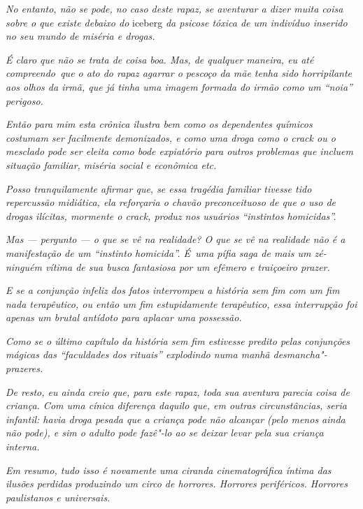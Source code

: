 \emph{No entanto, não se pode, no caso deste rapaz, se aventurar a dizer
muita coisa sobre o que existe debaixo do} iceberg \emph{da psicose tóxica de
um indivíduo inserido no seu mundo de miséria e drogas.}

\emph{É claro que não se trata de coisa boa. Mas, de qualquer maneira,
eu até compreendo~que o ato do rapaz agarrar o pescoço da mãe tenha sido
horripilante aos olhos da irmã, que já tinha uma imagem formada do irmão
como um ``noia'' perigoso.}

\emph{Então para mim esta crônica ilustra bem como os dependentes
químicos costumam ser facilmente demonizados, e como uma droga como o
crack ou o mesclado pode ser eleita como bode expiatório para outros
problemas que incluem situação familiar, miséria social e econômica
etc.}

\emph{Posso tranquilamente afirmar que, se essa tragédia familiar
tivesse tido repercussão midiática, ela reforçaria o chavão
preconceituoso de que o uso de drogas ilícitas, mormente o crack, produz
nos usuários ``instintos homicidas''.}

\emph{Mas --- pergunto --- o que se vê na realidade? O que se vê na
realidade não é a manifestação de um ``instinto homicida''. É~uma pífia
saga de mais um zé-ninguém vítima de sua busca fantasiosa por um efêmero
e traiçoeiro prazer.}

\emph{E se a conjunção infeliz dos fatos interrompeu a história sem fim
com um fim nada terapêutico, ou então um fim estupidamente terapêutico,
essa interrupção foi apenas um brutal antídoto para aplacar uma
possessão.}

\emph{Como se o último capítulo da história sem fim estivesse predito
pelas conjunções mágicas das ``faculdades dos rituais'' explodindo numa
manhã desmancha"-prazeres.}

\emph{De resto, eu ainda creio que, para este rapaz, toda sua aventura
parecia coisa de criança. Com uma cínica diferença daquilo que, em
outras circunstâncias, seria infantil: havia droga pesada que a criança
pode não alcançar (pelo menos ainda não pode), e sim o adulto pode
fazê"-lo ao se deixar levar pela sua criança interna.}

\emph{Em resumo, tudo isso é novamente uma ciranda cinematográfica
íntima das ilusões perdidas produzindo um circo de horrores. Horrores
periféricos. Horrores paulistanos e universais.}
\endgroup